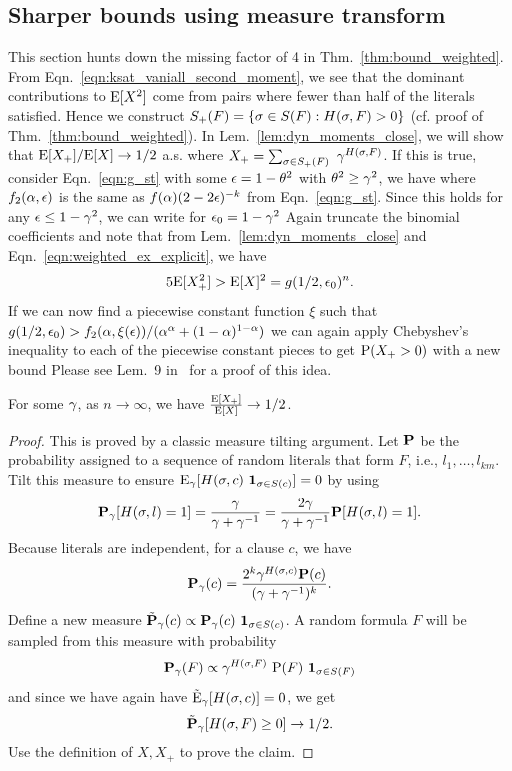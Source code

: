 \documentclass[letterpaper, 10pt, twocolumn, reqno]{amsart}
\begin{document}
\subsection{Sharper bounds using measure transform}
\label{ssec:sharper_bounds}

This section hunts down the missing factor of 4 in Thm.~\ref{thm:bound_weighted}. From Eqn.~\eqref{eqn:ksat_vaniall_second_moment}, we see that the dominant
contributions to $\E[X^2]$ come from pairs where fewer than half of the
literals satisfied. Hence we construct
$\spf = \cbrac{\s \in \sf: \hsf > 0}$
(cf. proof of Thm.~\ref{thm:bound_weighted}). In Lem.~\ref{lem:dyn_moments_close}, we will show that $\E[X_+]/\E[X] \to 1/2$ a.s. where $X_+ = \sum_{\s \in \spf}\ \g^\hsf$. If this is true, consider Eqn.~\ref{eqn:g_st} with some $\e = 1 -\th^2$ with $\th^2 \geq \g^2$, we have
where $f_2(\a,\e)$ is the same as $f(\a) (2-2\e)^{-k}$ from Eqn.~\eqref{eqn:g_st}. Since this holds for any $\e \leq 1 -\g^2$, we can write for $\e_0 = 1 - \g^2$
Again truncate the binomial coefficients and note that from Lem.~\ref{lem:dyn_moments_close} and Eqn.~\eqref{eqn:weighted_ex_explicit}, we have
$$
5 \E[X_+^2] > \E[X]^2 = g(1/2, \e_0)^n.
$$
If we can now find a piecewise constant function $\xi$ such that $g(1/2,\e_0) > f_2(\a,\xi(\e))/(\a^\a + (1-\a)^{1-\a})$ we can again apply Chebyshev's inequality to each of the piecewise constant pieces to get $\P(X_+ > 0)$ with a new bound
Please see Lem.~9 in~\cite{achlioptas2004threshold} for a proof of this idea.

\begin{lemma}
For some $\g$, as $n\to \infty$, we have $\f{\E[X_+]}{\E[X]} \to 1/2$.
\label{lem:dyn_moments_close}
\end{lemma}
\begin{proof}
This is proved by a classic measure tilting argument. Let $\bP$ be the probability assigned to a sequence of random literals that form $F$, i.e., $l_1, \ldots, l_{km}$. Tilt this measure to ensure $\E_\g[\hsc\ \ind_{\s \in \sc}] = 0$ by using
$$
\bPg[\hsl = 1] = \f{\g}{\g + \g^{-1}} = \f{2 \g}{\g + \g^{-1}} \bP[\hsl = 1].
$$
Because literals are independent, for a clause $c$, we have
$$
\bPg(c) = \f{2^k \g^{\hsc} \bP(c)}{(\g +\g^{-1})^k}.
$$
Define a new measure $\btPg(c) \propto \bPg(c)\ \ind_{\s \in \sc}$. A random formula $F$ will be sampled from this measure with probability
$$
\bPg(F) \propto \g^{\hsf}\ \P(F)\ \ind_{\s \in \sf}
$$
and since we have again have $\tilde{\E}_\g[\hsc] = 0$, we get
$$
\btPg[\hsf \geq 0] \to 1/2.
$$
Use the definition of $X, X_+$ to prove the claim.
\end{proof}
\end{document}
